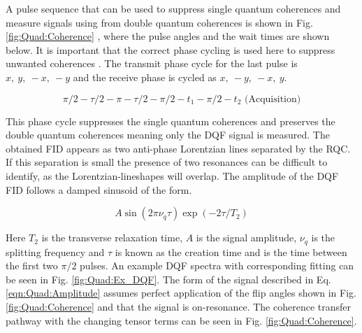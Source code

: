 A pulse sequence that can be used to suppress single quantum coherences and measure signals using from double quantum coherences is shown in Fig. \ref{fig:Quad:Coherence} \cite{Sharf1995DetectionNMR-Spectroscopy}, where the pulse angles and the wait times are shown below. It is important that the correct phase cycling is used here to suppress unwanted coherences \cite{Bodenhausen1984SelectionExperiments}. The transmit phase cycle for the last pulse is $x,\:y,\:-x,\:-y$ and the receive phase is cycled as $x,\:-y,\:-x,\:y$. 

\begin{equation}
    \pi/2-\tau/2-\pi-\tau/2-\pi/2-t_1-\pi/2-t_2 \textrm{ (Acquisition)}
    \label{eqn:Quad:Pulse}
\end{equation}

This phase cycle suppresses the single quantum coherences and preserves the double quantum coherences meaning only the \ac{DQF} signal is measured. The obtained FID appears as two anti-phase Lorentzian lines separated by the \ac{RQC}. If this separation is small the presence of two resonances can be difficult to identify, as the Lorentzian-lineshapes will overlap. The amplitude of the \ac{DQF} FID follows a damped sinusoid of the form. 

\begin{equation}
    A\sin(2\pi\nu_q\tau)\exp(-2\tau/T_2)
    \label{eqn:Quad:Amplitude}
\end{equation}

\noindent Here $T_2$ is the transverse relaxation time, $A$ is the signal amplitude, $\nu_q$ is the splitting frequency and $\tau$ is known as the creation time and is the time between the first two $\pi/2$ pulses. An example \ac{DQF} spectra with corresponding fitting can be seen in Fig. \ref{fig:Quad:Ex_DQF}. The form of the signal described in Eq. \ref{eqn:Quad:Amplitude} assumes perfect application of the flip angles shown in Fig. \ref{fig:Quad:Coherence} and that the signal is on-resonance. The coherence transfer pathway with the changing tensor terms can be seen in Fig. \ref{fig:Quad:Coherence}.


